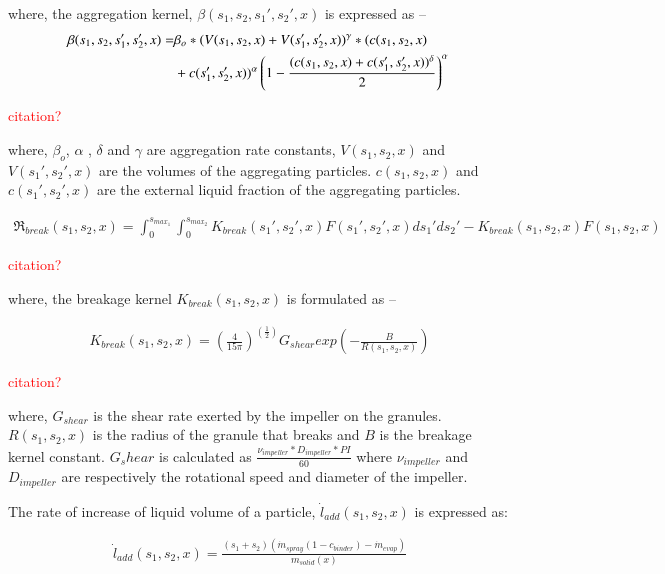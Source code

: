 \documentclass[preprint,11pt,authoryear]{elsarticle}
\begin{document}
\par where, the aggregation kernel, $\beta(s_1,s_2, s_1',s_2',x)$ is expressed as –
\begin{align}
\beta(s_1,s_2,s_1',s_2',x) = & \beta_o*(V(s_1,s_2,x)+V(s_1',s_2',x))^{\gamma}*(c(s_1,s_2,x)\notag\\
&+c(s_1',s_2',x))^{\alpha}\left(1-\frac{(c(s_1,s_2,x)+c(s_1',s_2',x))^{\delta}}{2}\right)^{\alpha}\
\label{eqn:mthds_sa_pbm_beta_kernal} 
\end{align}
\par \textcolor{red}{citation?}

\par where, $\beta_o$,  $\alpha$ , $\delta$ and $\gamma$ are aggregation rate constants, $V(s_1,s_2, x)$ and $V(s_1',s_2',x)$ are the volumes of the aggregating particles. $c(s_1,s_2, x)$ and $c(s_1',s_2',x)$ are the external liquid fraction of the aggregating particles.

\begin{align}
\Re_{break}(s_1,s_2,x) = \int_0^{s_{max_1}} \int_0^{s_{max_2}} K_{break}(s_1',s_2',x)F(s_1',s_2',x)ds_1'ds_2' - K_{break}(s_1,s_2,x)F(s_1,s_2,x)
\end{align}
\par \textcolor{red}{citation?}

\par where, the breakage kernel $K_{break}(s_1,s_2,x)$ is formulated as –

\begin{align}
K_{break}(s_1,s_2,x)=\left(\frac{4}{15\pi}\right)^{(\frac{1}{2})}G_{shear}exp\left(-\frac{B}{R(s_1,s_2,x)}\right)
\end{align}
\par \textcolor{red}{citation?}

\par where, $G_{shear}$ is the shear rate exerted by the impeller on the granules. $R(s_1,s_2,x)$ is the radius of the granule that breaks and $B$ is the breakage kernel constant. $G_shear$ is calculated as $\frac{\nu_{impeller}*D_{impeller}*PI}{60}$ where $\nu_{impeller}$ and $D_{impeller}$ are respectively the rotational speed and diameter of the impeller.

The rate of increase of liquid volume of a particle, $\dot{l}_{add}(s_1,s_2,x)$ is expressed as:

\begin{align}
\dot{l}_{add}(s_1,s_2,x) = \frac{(s_1+s_2)(\dot{m}_{spray}(1-c_{binder})-\dot{m}_{evap})}{m_{solid}(x)}
\label{eqn:mthds_rate_liq_vol_part}
\end{align}
\end{document}
